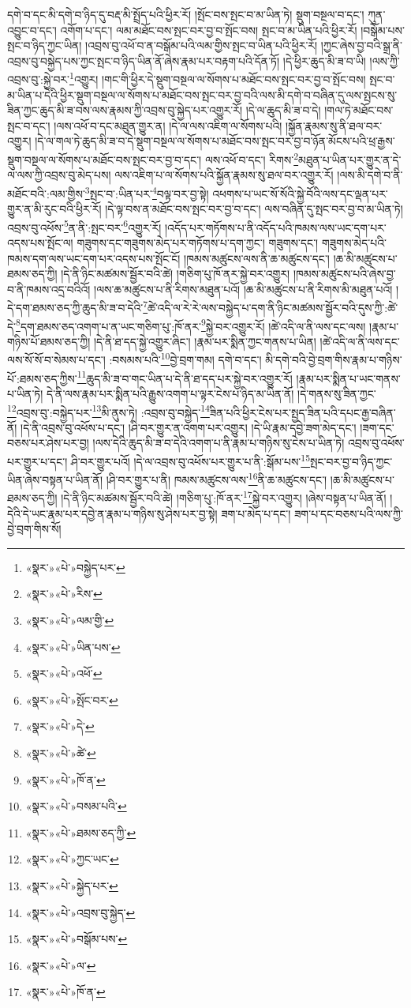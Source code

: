 དགེ་བ་དང་མི་དགེ་བ་ཉིད་དུ་བརྡ་མི་སྤྲོད་པའི་ཕྱིར་རོ། །སྤོང་བས་སྤང་བ་མ་ཡིན་ཏེ། སྡུག་བསྔལ་བ་དང་། ཀུན་འབྱུང་བ་དང་། འགོག་པ་དང་། ལམ་མཐོང་བས་སྤང་བར་བྱ་བ་སྤོང་བས། སྤང་བ་མ་ཡིན་པའི་ཕྱིར་རོ། །བསྒོམ་པས་སྤང་བ་ཉིད་ཀྱང་ཡིན། །འབྲས་བུ་འཕོ་བ་ན་བསྒོམ་པའི་ལམ་གྱིས་སྤང་བ་ཡིན་པའི་ཕྱིར་རོ། །ཀྱང་ཞེས་བྱ་བའི་སྒྲ་ནི་འབྲས་བུ་བསྐྱེད་པས་ཀྱང་སྤང་བ་ཉིད་ཡིན་ནོ་ཞེས་རྣམ་པར་བརྟག་པའི་དོན་ཏོ། །དེ་ཕྱིར་ཆུད་མི་ཟ་བ་ཡི། །ལས་ཀྱི་འབྲས་བུ་:སྐྱེ་བར་\footnote{«སྣར་»«པེ་»བསྐྱེད་པར་}འགྱུར། །གང་གི་ཕྱིར་དེ་སྡུག་བསྔལ་ལ་སོགས་པ་མཐོང་བས་སྤང་བར་བྱ་བ་སྤོང་བས། སྤང་བ་མ་ཡིན་པ་དེའི་ཕྱིར་སྡུག་བསྔལ་ལ་སོགས་པ་མཐོང་བས་སྤང་བར་བྱ་བའི་ལས་མི་དགེ་བ་བཞིན་དུ་ལས་སྤངས་སུ་ཟིན་ཀྱང་ཆུད་མི་ཟ་བས་ལས་རྣམས་ཀྱི་འབྲས་བུ་སྐྱེད་པར་འགྱུར་རོ། །དེ་ལ་ཆུད་མི་ཟ་བ་དེ། །གལ་ཏེ་མཐོང་བས་སྤང་བ་དང་། །ལས་འཕོ་བ་དང་མཐུན་གྱུར་ན། །དེ་ལ་ལས་འཇིག་ལ་སོགས་པའི། །སྐྱོན་རྣམས་སུ་ནི་ཐལ་བར་འགྱུར། །དེ་ལ་གལ་ཏེ་ཆུད་མི་ཟ་བ་དེ་སྡུག་བསྔལ་ལ་སོགས་པ་མཐོང་བས་སྤང་བར་བྱ་བ་ཉོན་མོངས་པའི་ཕྲ་རྒྱས་སྡུག་བསྔལ་ལ་སོགས་པ་མཐོང་བས་སྤང་བར་བྱ་བ་དང་། ལས་འཕོ་བ་དང་། རིགས་\footnote{«སྣར་»«པེ་»རིས་}མཐུན་པ་ཡིན་པར་གྱུར་ན་དེ་ལ་ལས་ཀྱི་འབྲས་བུ་མེད་པས། ལས་འཇིག་པ་ལ་སོགས་པའི་སྐྱོན་རྣམས་སུ་ཐལ་བར་འགྱུར་རོ། །ལས་མི་དགེ་བ་ནི་མཐོང་བའི་:ལམ་གྱིས་\footnote{«སྣར་»«པེ་»ལམ་གྱི་}སྤང་བ་:ཡིན་པར་\footnote{«སྣར་»«པེ་»ཡིན་པས་}བལྟ་བར་བྱ་སྟེ། འཕགས་པ་ཡང་སོ་སོའི་སྐྱེ་བོའི་ལས་དང་ལྡན་པར་གྱུར་ན་མི་རུང་བའི་ཕྱིར་རོ། །དེ་ལྟ་བས་ན་མཐོང་བས་སྤང་བར་བྱ་བ་དང་། ལས་བཞིན་དུ་སྤང་བར་བྱ་བ་མ་ཡིན་ཏེ། འབྲས་བུ་འཕོས་\footnote{«སྣར་»«པེ་»འཕོ་}ན་ནི་:སྤང་བར་\footnote{«སྣར་»«པེ་»སྤོང་བར་}འགྱུར་རོ། །འདོད་པར་གཏོགས་པ་ནི་འདོད་པའི་ཁམས་ལས་ཡང་དག་པར་འདས་པས་སྤོང་ལ། གཟུགས་དང་གཟུགས་མེད་པར་གཏོགས་པ་དག་ཀྱང་། གཟུགས་དང་། གཟུགས་མེད་པའི་ཁམས་དག་ལས་ཡང་དག་པར་འདས་པས་སྤོང་ངོ། །ཁམས་མཚུངས་ལས་ནི་ཆ་མཚུངས་དང་། །ཆ་མི་མཚུངས་པ་ཐམས་ཅད་ཀྱི། །དེ་ནི་ཉིང་མཚམས་སྦྱོར་བའི་ཚེ། །གཅིག་པུ་ཁོ་ནར་སྐྱེ་བར་འགྱུར། །ཁམས་མཚུངས་པའི་ཞེས་བྱ་བ་ནི་ཁམས་འདྲ་བའིའོ། །ལས་ཆ་མཚུངས་པ་ནི་རིགས་མཐུན་པའོ། །ཆ་མི་མཚུངས་པ་ནི་རིགས་མི་མཐུན་པའོ། །དེ་དག་ཐམས་ཅད་ཀྱི་ཆུད་མི་ཟ་བ་དེའི་\footnote{«སྣར་»«པེ་»དེ་}ཚེ་འདི་ལ་རེ་རེ་ལས་བསྐྱེད་པ་དག་ནི་ཉིང་མཚམས་སྦྱོར་བའི་དུས་ཀྱི་:ཚེ་དེ་\footnote{«སྣར་»«པེ་»ཚེ་}དག་ཐམས་ཅད་འགག་པ་ན་ཡང་གཅིག་པུ་:ཁོ་ནར་\footnote{«སྣར་»«པེ་»ཁོ་ན་}སྐྱེ་བར་འགྱུར་རོ། །ཚེ་འདི་ལ་ནི་ལས་དང་ལས། །རྣམ་པ་གཉིས་པོ་ཐམས་ཅད་ཀྱི། །དེ་ནི་ཐ་དད་སྐྱེ་འགྱུར་ཞིང་། །རྣམ་པར་སྨིན་ཀྱང་གནས་པ་ཡིན། །ཚེ་འདི་ལ་ནི་ལས་དང་ལས་སོ་སོ་བ་སེམས་པ་དང་། :བསམས་པའི་\footnote{«སྣར་»«པེ་»བསམ་པའི་}བྱེ་བྲག་གམ། དགེ་བ་དང་། མི་དགེ་བའི་བྱེ་བྲག་གིས་རྣམ་པ་གཉིས་པོ་:ཐམས་ཅད་ཀྱིས་\footnote{«སྣར་»«པེ་»ཐམས་ཅད་ཀྱི་}ཆུད་མི་ཟ་བ་གང་ཡིན་པ་དེ་ནི་ཐ་དད་པར་སྐྱེ་བར་འགྱུར་རོ། །རྣམ་པར་སྨིན་པ་ཡང་གནས་པ་ཡིན་ཏེ། དེ་ནི་ལས་རྣམ་པར་སྨིན་པའི་རྒྱུས་འགག་པ་ལྟར་ངེས་པ་ཉིད་མ་ཡིན་ནོ། །དེ་གནས་སུ་ཟིན་ཀྱང་\footnote{«སྣར་»«པེ་»ཀྱང་ཡང་}འབྲས་བུ་:བསྐྱེད་པར་\footnote{«སྣར་»«པེ་»སྐྱེད་པར་}མི་ནུས་ཏེ། :འབྲས་བུ་བསྐྱེད་\footnote{«སྣར་»«པེ་»འབྲས་བུ་སྐྱེད་}ཟིན་པའི་ཕྱིར་ངེས་པར་སྤྱད་ཟིན་པའི་དཔང་རྒྱ་བཞིན་ནོ། །དེ་ནི་འབྲས་བུ་འཕོས་པ་དང་། །ཤི་བར་གྱུར་ན་འགག་པར་འགྱུར། །དེ་ཡི་རྣམ་དབྱེ་ཟག་མེད་དང་། །ཟག་དང་བཅས་པར་ཤེས་པར་བྱ། །ལས་དེའི་ཆུད་མི་ཟ་བ་དེའི་འགག་པ་ནི་རྣམ་པ་གཉིས་སུ་ངེས་པ་ཡིན་ཏེ། འབྲས་བུ་འཕོས་པར་གྱུར་པ་དང་། ཤི་བར་གྱུར་པའོ། །དེ་ལ་འབྲས་བུ་འཕོས་པར་གྱུར་པ་ནི་:སྒོམ་པས་\footnote{«སྣར་»«པེ་»བསྒོམ་པས་}སྤང་བར་བྱ་བ་ཉིད་ཀྱང་ཡིན་ཞེས་བསྟན་པ་ཡིན་ནོ། །ཤི་བར་གྱུར་པ་ནི། ཁམས་མཚུངས་ལས་\footnote{«སྣར་»«པེ་»ལ་}ནི་ཆ་མཚུངས་དང་། །ཆ་མི་མཚུངས་པ་ཐམས་ཅད་ཀྱི། །དེ་ནི་ཉིང་མཚམས་སྦྱོར་བའི་ཚེ། །གཅིག་པུ་:ཁོ་ནར་\footnote{«སྣར་»«པེ་»ཁོ་ན་}སྐྱེ་བར་འགྱུར། །ཞེས་བསྟན་པ་ཡིན་ནོ། །དེའི་དེ་ཡང་རྣམ་པར་དབྱེ་ན་རྣམ་པ་གཉིས་སུ་ཤེས་པར་བྱ་སྟེ། ཟག་པ་མེད་པ་དང་། ཟག་པ་དང་བཅས་པའི་ལས་ཀྱི་བྱེ་བྲག་གིས་སོ། 
